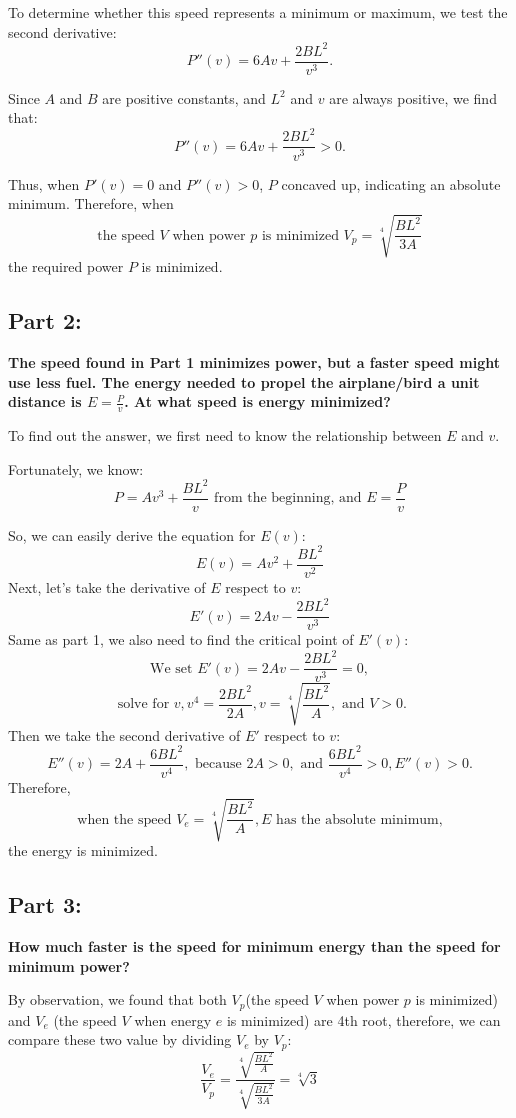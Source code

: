 \documentclass{article}
\begin{document}
To determine whether this speed represents a minimum or maximum, we test the second derivative:
\[
P''(v) = 6Av + \frac{2BL^2}{v^3}.
\]

Since \( A \) and \( B \) are positive constants, and \( L^2 \) and \( v \) are always positive, we find that:
\[
P''(v) = 6Av + \frac{2BL^2}{v^3} > 0.
\]

Thus, when \( P'(v) = 0 \) and \( P''(v) > 0 \), \( P \) concaved up, indicating an absolute minimum. Therefore, when
\[
\text{the speed } V \text{ when power } p \text{ is minimized }  V_p = \sqrt[4]{\frac{BL^2}{3A}}
\]
the required power \( P \) is minimized.

\subsection*{Part 2:}
{\large \bfseries The speed found in Part 1 minimizes power, but a faster speed might use less fuel. The energy needed to propel the airplane/bird a unit distance is \( E = \frac{P}{v} \). At what speed is energy minimized?}

To find out the answer, we first need to know the relationship between \( E \) and \( v \). 

Fortunately, we know:
\[
P = Av^3 + \frac{BL^2}{v} \text{ from the beginning, and }
E = \frac{P}{v}
\]

So, we can easily derive the equation for \( E(v) \):
\[
E(v) = Av^2 + \frac{BL^2}{v^2}
\]
Next, let's take the derivative of \(E\) respect to \(v\):
\[
E'(v) = 2Av-\frac{2BL^2}{v^3}
\]
Same as part 1, we also need to find the critical point of \(E'(v)\):
\[\text{We set } E'(v) = 2Av-\frac{2BL^2}{v^3} = 0,\]
\[\text{ solve for }v, v^4=\frac{2BL^2}{2A}, v = \sqrt[4]{\frac{BL^2}{A}},\text{ and }V > 0.\]
Then we take the second derivative of \(E'\) respect to \(v\):
\[E''(v) = 2A + \frac{6BL^2}{v^4},
\text{ because } 2A > 0, \text{ and } \frac{6BL^2}{v^4} > 0, E''(v) > 0.\]
Therefore,
 \[\text{when the speed }V_e = \sqrt[4]{\frac{BL^2}{A}}, E\text{ has the absolute minimum,}\]
  the energy is minimized.

\subsection*{Part 3:}
{\large \bfseries How much faster is the speed for minimum energy than the speed for minimum power?
}\setlength{\parskip}{1em}

By observation, we found that both \(V_p\)(the speed \(V\) when power \(p\) is minimized) and \(V_e\) (the speed \(V\) when energy \(e\) is minimized) are 4th root, therefore, we can compare these two value by dividing \(V_e\) by \(V_p\):
\[\frac{V_e}{V_p}=\frac{\sqrt[4]{\frac{BL^2}{A}}}{\sqrt[4]{\frac{BL^2}{3A}}} = \sqrt[4]{3}\]
\end{document}

